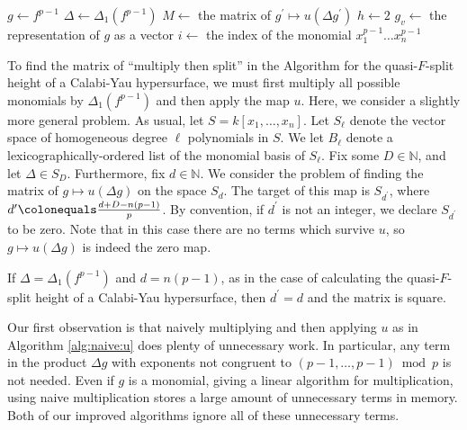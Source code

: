 \begin{algorithm}[H]
\caption{Quasi-\(F\)-split height: matrix-based algorithm}
\label{alg:qfs:matrix}
$g \gets f^{p - 1}$\;
$\Delta \gets \Delta_1(f^{p - 1})$\;
$M \gets $ the matrix of $g^{\prime} \mapsto u(\Delta g^{\prime})$\;
$h \gets 2$\;
$g_v \gets $ the representation of $g$ as a vector\;
$i \gets $ the index of the monomial $x_{1}^{p - 1} \dots x_{n}^{p - 1}$\;
\end{algorithm}


To find the matrix of ``multiply then split''
in the Algorithm for the quasi-\(F\)-split height
of a Calabi-Yau hypersurface, 
we must first multiply all possible 
monomials by \(\Delta_{1}(f^{p-1})\)
and then apply the map \(u\).
Here, we consider a slightly more general problem.
As usual, let \(S = k[x_{1}, \ldots, x_{n}]\).
Let $S_\ell$ denote the vector space of homogeneous degree $\ell$ polynomials in \(S\).
We let \(B_{\ell}\) denote a lexicographically-ordered list
of the monomial basis of \(S_{\ell}\).
Fix some \(D \in \mathbb{N}\), and let \(\Delta \in S_D\).
Furthermore, fix \(d \in \mathbb{N}\).
We consider the problem of finding the matrix of 
\(g \mapsto u(\Delta g)\)
on the space \(S_{d}\).
The target of this map is
\(S_{d^{\prime}}\), where
\(d^{\prime} \colonequals \tfrac{d+D-n(p-1)}{p}\).
By convention, if \(d^{\prime}\) is not an integer,
we declare \(S_{d^{\prime}}\) to be zero.
Note that in this case there are
no terms which survive \(u\), so
\(g \mapsto u(\Delta g)\) is indeed the zero map.

\begin{rmk}
    If \(\Delta = \Delta_{1}(f^{p-1})\) and \(d = n(p-1)\),
	as in the case of calculating the quasi-\(F\)-split
	height of a Calabi-Yau hypersurface, 
	then \(d^{\prime} = d\) and the matrix is 
	square.
\end{rmk}

Our first observation is that naively 
multiplying and then applying \(u\) 
as in Algorithm \ref{alg:naive:u}
does plenty of unnecessary work.
In particular, any term in the 
product \(\Delta g\) with exponents 
not congruent to 
\((p-1, \ldots, p-1) \bmod p\)
is not needed. 
Even if \(g\) is a monomial, giving a linear
algorithm for multiplication, using naive
multiplication stores a large amount of unnecessary terms
in memory.
Both of our improved algorithms ignore
all of these unnecessary terms.

